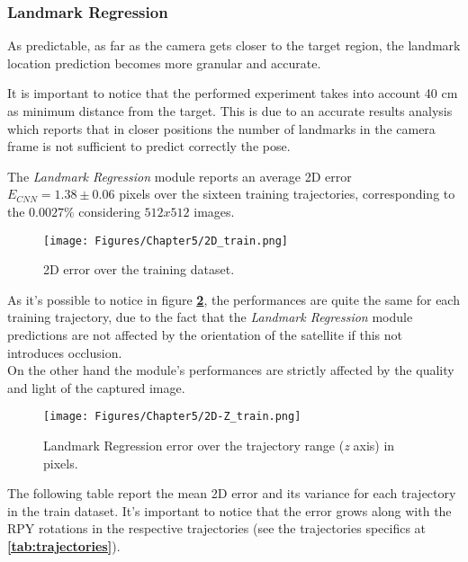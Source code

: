 \subsubsection{Landmark Regression}
As predictable, as far as the camera gets closer to the target region, the landmark location prediction becomes more granular and accurate.

It is important to notice that the performed experiment takes into account 40 cm as minimum distance from the target. This is due to an accurate results analysis which reports that in closer positions the number of landmarks in the camera frame is not sufficient to predict correctly the pose.

The \textit{Landmark Regression} module reports an average 2D error $E_{CNN}=1.38 \pm 0.06$ pixels over the sixteen training trajectories, corresponding to the $0.0027\%$ considering $512x512$ images.
\begin{figure}[H]
    \centering
    \texttt{[image: Figures/Chapter5/2D\_train.png]}
    \caption[2D error over the training dataset.]{2D error over the training dataset.}
    \label{fig:2D Train}
\end{figure}

As it's possible to notice in figure \textbf{\ref{fig:2D-Z Train}}, the performances are quite the same for each training trajectory, due to the fact that the \textit{Landmark Regression} module predictions are not affected by the orientation of the satellite if this not introduces occlusion.\\
On the other hand the module's performances are strictly affected by the quality and light of the captured image.

\begin{figure}[H]
    \centering
    \texttt{[image: Figures/Chapter5/2D-Z\_train.png]}
    \caption[Landmark Regression error over the trajectory range.]{Landmark Regression error over the trajectory range (\textit{z} axis) in pixels.}
    \label{fig:2D-Z Train}
\end{figure}

\newpage
The following table report the mean 2D error and its variance for each trajectory in the train dataset. It's important to notice that the error grows along with the RPY rotations in the respective trajectories (see the trajectories specifics at \textbf{\ref{tab:trajectories}}).

